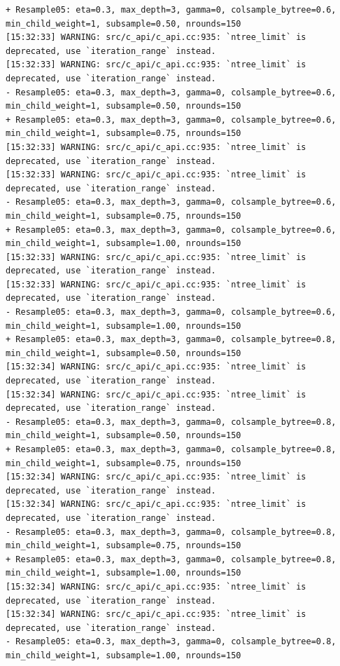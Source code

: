 \documentclass[
  letterpaper,
  DIV=11,
  numbers=noendperiod]{scrartcl}
\begin{document}
\begin{verbatim}
+ Resample05: eta=0.3, max_depth=3, gamma=0, colsample_bytree=0.6, min_child_weight=1, subsample=0.50, nrounds=150 
[15:32:33] WARNING: src/c_api/c_api.cc:935: `ntree_limit` is deprecated, use `iteration_range` instead.
[15:32:33] WARNING: src/c_api/c_api.cc:935: `ntree_limit` is deprecated, use `iteration_range` instead.
- Resample05: eta=0.3, max_depth=3, gamma=0, colsample_bytree=0.6, min_child_weight=1, subsample=0.50, nrounds=150 
+ Resample05: eta=0.3, max_depth=3, gamma=0, colsample_bytree=0.6, min_child_weight=1, subsample=0.75, nrounds=150 
[15:32:33] WARNING: src/c_api/c_api.cc:935: `ntree_limit` is deprecated, use `iteration_range` instead.
[15:32:33] WARNING: src/c_api/c_api.cc:935: `ntree_limit` is deprecated, use `iteration_range` instead.
- Resample05: eta=0.3, max_depth=3, gamma=0, colsample_bytree=0.6, min_child_weight=1, subsample=0.75, nrounds=150 
+ Resample05: eta=0.3, max_depth=3, gamma=0, colsample_bytree=0.6, min_child_weight=1, subsample=1.00, nrounds=150 
[15:32:33] WARNING: src/c_api/c_api.cc:935: `ntree_limit` is deprecated, use `iteration_range` instead.
[15:32:33] WARNING: src/c_api/c_api.cc:935: `ntree_limit` is deprecated, use `iteration_range` instead.
- Resample05: eta=0.3, max_depth=3, gamma=0, colsample_bytree=0.6, min_child_weight=1, subsample=1.00, nrounds=150 
+ Resample05: eta=0.3, max_depth=3, gamma=0, colsample_bytree=0.8, min_child_weight=1, subsample=0.50, nrounds=150 
[15:32:34] WARNING: src/c_api/c_api.cc:935: `ntree_limit` is deprecated, use `iteration_range` instead.
[15:32:34] WARNING: src/c_api/c_api.cc:935: `ntree_limit` is deprecated, use `iteration_range` instead.
- Resample05: eta=0.3, max_depth=3, gamma=0, colsample_bytree=0.8, min_child_weight=1, subsample=0.50, nrounds=150 
+ Resample05: eta=0.3, max_depth=3, gamma=0, colsample_bytree=0.8, min_child_weight=1, subsample=0.75, nrounds=150 
[15:32:34] WARNING: src/c_api/c_api.cc:935: `ntree_limit` is deprecated, use `iteration_range` instead.
[15:32:34] WARNING: src/c_api/c_api.cc:935: `ntree_limit` is deprecated, use `iteration_range` instead.
- Resample05: eta=0.3, max_depth=3, gamma=0, colsample_bytree=0.8, min_child_weight=1, subsample=0.75, nrounds=150 
+ Resample05: eta=0.3, max_depth=3, gamma=0, colsample_bytree=0.8, min_child_weight=1, subsample=1.00, nrounds=150 
[15:32:34] WARNING: src/c_api/c_api.cc:935: `ntree_limit` is deprecated, use `iteration_range` instead.
[15:32:34] WARNING: src/c_api/c_api.cc:935: `ntree_limit` is deprecated, use `iteration_range` instead.
- Resample05: eta=0.3, max_depth=3, gamma=0, colsample_bytree=0.8, min_child_weight=1, subsample=1.00, nrounds=150 

\end{verbatim}
\end{document}
